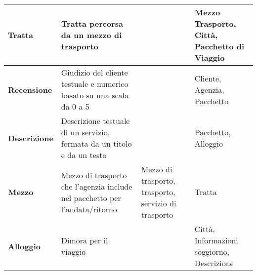 \begin{center}
\begin{tabularx}{\textwidth}{p{} X >{\raggedright\arraybackslash}p{} >{\raggedright\arraybackslash}p{}}
        \\\midrule
        \textbf{Tratta} & Tratta percorsa da un mezzo di trasporto & & Mezzo Trasporto, Città, Pacchetto di Viaggio
        \\\midrule
        \textbf{Recensione} & Giudizio del cliente testuale e numerico basato su una scala da 0 a 5 & & Cliente, Agenzia, Pacchetto 
        \\\midrule
        \textbf{Descrizione} & Descrizione testuale di un servizio, formata da un titolo e da un testo & & Pacchetto, Alloggio
        \\\midrule
        \textbf{Mezzo} & Mezzo di trasporto che l'agenzia include nel pacchetto per l'andata/ritorno & Mezzo di trasporto, trasporto, servizio di trasporto & Tratta
        \\\midrule
        \textbf{Alloggio} & Dimora per il viaggio & & Città, Informazioni soggiorno, Descrizione
        \\
    \end{tabularx}
\end{center}

